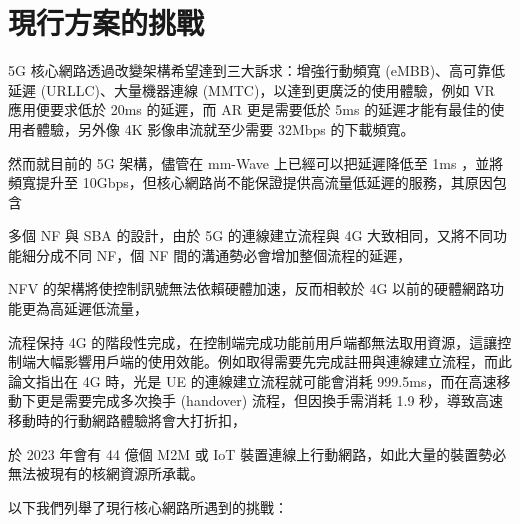 \section{現行方案的挑戰}
\label{sec:challenge}


5G 核心網路透過改變架構希望達到三大訴求：增強行動頻寬 (eMBB)、高可靠低延遲 (URLLC)、大量機器連線 (MMTC)，以達到更廣泛的使用體驗，例如 VR 應用便要求低於 20ms 的延遲\cite{URLLVR}，而 AR 更是需要低於 5ms 的延遲才能有最佳的使用者體驗\cite{cloud_arvr_wp}，另外像 4K 影像串流就至少需要 32Mbps 的下載頻寬\cite{4k_req}。

然而就目前的 5G 架構，儘管在 mm-Wave 上已經可以把延遲降低至 1ms \cite{LLmmWave}，並將頻寬提升至 10Gbps，但核心網路尚不能保證提供高流量低延遲的服務，其原因包含
\begin{enumerate*}
\item 多個 NF 與 SBA 的設計，由於 5G 的連線建立流程與 4G 大致相同，又將不同功能細分成不同 NF，個 NF 間的溝通勢必會增加整個流程的延遲，
\item NFV 的架構將使控制訊號無法依賴硬體加速，反而相較於 4G 以前的硬體網路功能更為高延遲低流量，
\item 流程保持 4G 的階段性完成，在控制端完成功能前用戶端都無法取用資源，這讓控制端大幅影響用戶端的使用效能。例如取得需要先完成註冊與連線建立流程，而此論文\cite{paper.DPCM}指出在 4G 時，光是 UE 的連線建立流程就可能會消耗 999.5ms，而在高速移動下更是需要完成多次換手 (handover) 流程，但因換手需消耗 1.9 秒\cite{paper.DPCM}，導致高速移動時的行動網路體驗將會大打折扣，
\item 於 2023 年會有 44 億個 M2M 或 IoT 裝置連線上行動網路\cite{cisco_internet_report_2023}，如此大量的裝置勢必無法被現有的核網資源所承載。
\end{enumerate*}

以下我們列舉了現行核心網路所遇到的挑戰：


